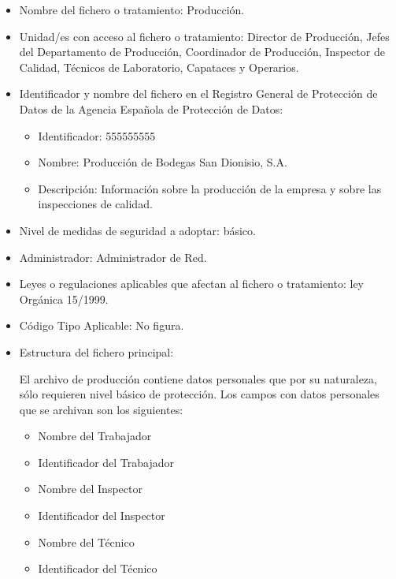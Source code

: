 \documentclass[a4paper,11pt,bibtotoc,noliststotoc]{scrbook}
\newcommand{\laorganizacion}{Bodegas San Dionisio, S.A.}
\begin{document}
\begin{itemize}
\item Nombre del fichero o tratamiento: Producción.

\item Unidad/es con acceso al fichero o tratamiento: Director de Producción, Jefes del Departamento de Producción, Coordinador de Producción, Inspector de Calidad, Técnicos de Laboratorio, Capataces y Operarios.

\item Identificador y nombre del fichero en el Registro General de Protección de Datos de la Agencia Española de Protección de Datos: 
	\begin{itemize}
	\item Identificador: 555555555
	\item Nombre: Producción de \laorganizacion
	\item Descripción: Información sobre la producción de la empresa y sobre las inspecciones de calidad.
	\end{itemize}

\item Nivel de medidas de seguridad a adoptar: básico.

\item Administrador: Administrador de Red.

\item Leyes o regulaciones aplicables que afectan al fichero o tratamiento: ley Orgánica 15/1999.

\item Código Tipo Aplicable: No figura.

\item Estructura del fichero principal: 

El archivo de producción contiene datos personales que por su naturaleza, sólo requieren nivel básico de protección. Los campos con datos personales que se archivan son los siguientes:

\begin{itemize}
\item Nombre del Trabajador
\item Identificador del Trabajador
\item Nombre del Inspector
\item Identificador del Inspector
\item Nombre del Técnico
\item Identificador del Técnico
\end{itemize}


\end{itemize}
\end{document}
